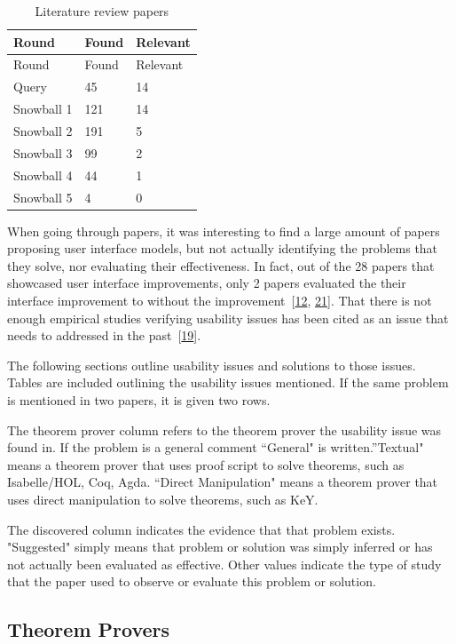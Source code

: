 \documentclass[
]{article}
\begin{document}
\hypertarget{tbl:litresults}{}
\begin{longtable}[]{@{}lll@{}}
\caption{\label{tbl:litresults}Literature review papers}\tabularnewline
\toprule
Round & Found & Relevant \\
\midrule
\endfirsthead
\toprule
Round & Found & Relevant \\
\midrule
\endhead
Query & 45 & 14 \\
Snowball 1 & 121 & 14 \\
Snowball 2 & 191 & 5 \\
Snowball 3 & 99 & 2 \\
Snowball 4 & 44 & 1 \\
Snowball 5 & 4 & 0 \\
\bottomrule
\end{longtable}

When going through papers, it was interesting to find a large amount of
papers proposing user interface models, but not actually identifying the
problems that they solve, nor evaluating their effectiveness. In fact,
out of the 28 papers that showcased user interface improvements, only 2
papers evaluated the their interface improvement to without the
improvement~{[}\protect\hyperlink{ref-berman_development_2014}{12},
\protect\hyperlink{ref-hentschel_empirical_2016}{21}{]}. That there is
not enough empirical studies verifying usability issues has been cited
as an issue that needs to addressed in the
past~{[}\protect\hyperlink{ref-hahnle_deductive_2019}{19}{]}.

The following sections outline usability issues and solutions to those
issues. Tables are included outlining the usability issues mentioned. If
the same problem is mentioned in two papers, it is given two rows.

The theorem prover column refers to the theorem prover the usability
issue was found in. If the problem is a general comment ``General" is
written.''Textual" means a theorem prover that uses proof script to
solve theorems, such as Isabelle/HOL, Coq, Agda. ``Direct Manipulation"
means a theorem prover that uses direct manipulation to solve theorems,
such as KeY.

The discovered column indicates the evidence that that problem exists.
"Suggested" simply means that problem or solution was simply inferred or
has not actually been evaluated as effective. Other values indicate the
type of study that the paper used to observe or evaluate this problem or
solution.

\hypertarget{theorem-provers}{%
\subsection{Theorem Provers}\label{theorem-provers}}
\end{document}
